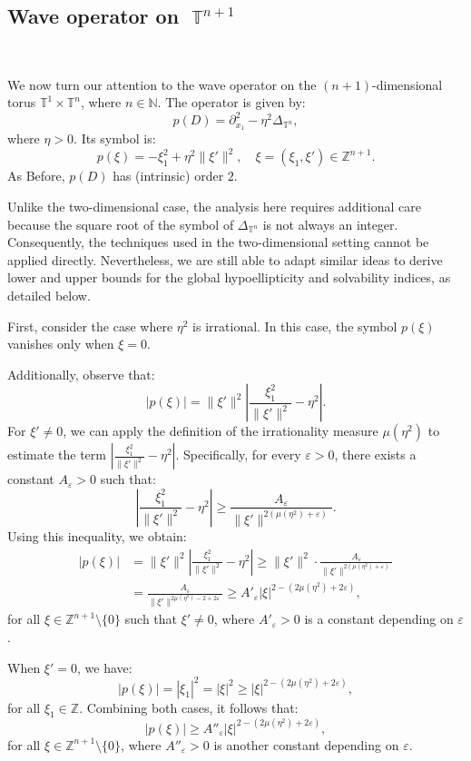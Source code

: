 \documentclass[11pt]{amsart}
\numberwithin{equation}{section}
\theoremstyle{definition}
\DeclareMathOperator{\T}{\mathbb{T}}
\begin{document}
\subsection{Wave operator on $\T^{n+1}$} \


	We now turn our attention to the wave operator on the $(n+1)$-dimensional torus $\mathbb{T}^1 \times \mathbb{T}^n$, where $n \in \mathbb{N}$. The operator is given by:
	\[
	p(D) = \partial_{x_1}^2 - \eta^2 \Delta_{\mathbb{T}^n}, 
	\]
	where $\eta > 0$. Its symbol is:
	\[
	p(\xi) = -\xi_1^2 + \eta^2 \|\xi'\|^2, \quad \xi = (\xi_1, \xi') \in \mathbb{Z}^{n+1}.
	\]
	As Before, $p(D)$ has (intrinsic) order $2$.
	
	Unlike the two-dimensional case, the analysis here requires additional care because the square root of the symbol of $\Delta_{\mathbb{T}^n}$ is not always an integer. Consequently, the techniques used in the two-dimensional setting cannot be applied directly. Nevertheless, we are still able to adapt similar ideas to derive lower and upper bounds for the global hypoellipticity and solvability indices, as detailed below.

	First, consider the case where $\eta^2$ is irrational. In this case, the symbol $p(\xi)$ vanishes only when $\xi = 0$. 
	
	Additionally, observe that:
	\[
	|p(\xi)| = \|\xi'\|^2 \left| \frac{\xi_1^2}{\|\xi'\|^2} - \eta^2 \right|.
	\]
	For $\xi' \neq 0$, we can apply the definition of the irrationality measure $\mu(\eta^2)$ to estimate the term $\left| \frac{\xi_1^2}{\|\xi'\|^2} - \eta^2 \right|$. Specifically, for every $\varepsilon > 0$, there exists a constant $A_\varepsilon > 0$ such that:
	\[
	\left| \frac{\xi_1^2}{\|\xi'\|^2} - \eta^2 \right| \geq \frac{A_\varepsilon}{\|\xi'\|^{2(\mu(\eta^2) + \varepsilon)}}.
	\]
	Using this inequality, we obtain:
	\begin{align*}
		|p(\xi)| &= \|\xi'\|^2 \left| \frac{\xi_1^2}{\|\xi'\|^2} - \eta^2 \right| 
		\geq \|\xi'\|^2 \cdot \frac{A_\varepsilon}{\|\xi'\|^{2(\mu(\eta^2) + \varepsilon)}} \\
		&= \frac{A_\varepsilon}{\|\xi'\|^{2\mu(\eta^2) - 2 + 2\varepsilon}} 
		\geq A'_\varepsilon |\xi|^{2 - (2\mu(\eta^2) + 2\varepsilon)},
	\end{align*}
	for all $\xi \in \mathbb{Z}^{n+1} \setminus \{0\}$ such that $\xi' \neq 0$, where $A'_\varepsilon > 0$ is a constant depending on $\varepsilon$.
	
	When $\xi' = 0$, we have:
	\[
	|p(\xi)| = |\xi_1|^2 = |\xi|^2 \geq |\xi|^{2 - (2\mu(\eta^2) + 2\varepsilon)},
	\]
	for all $\xi_1 \in \mathbb{Z}$. Combining both cases, it follows that:
	\[
	|p(\xi)| \geq A''_\varepsilon |\xi|^{2 - (2\mu(\eta^2) + 2\varepsilon)},
	\]
	for all $\xi \in \mathbb{Z}^{n+1} \setminus \{0\}$, where $A''_\varepsilon > 0$ is another constant depending on $\varepsilon$.
	
\end{document}
